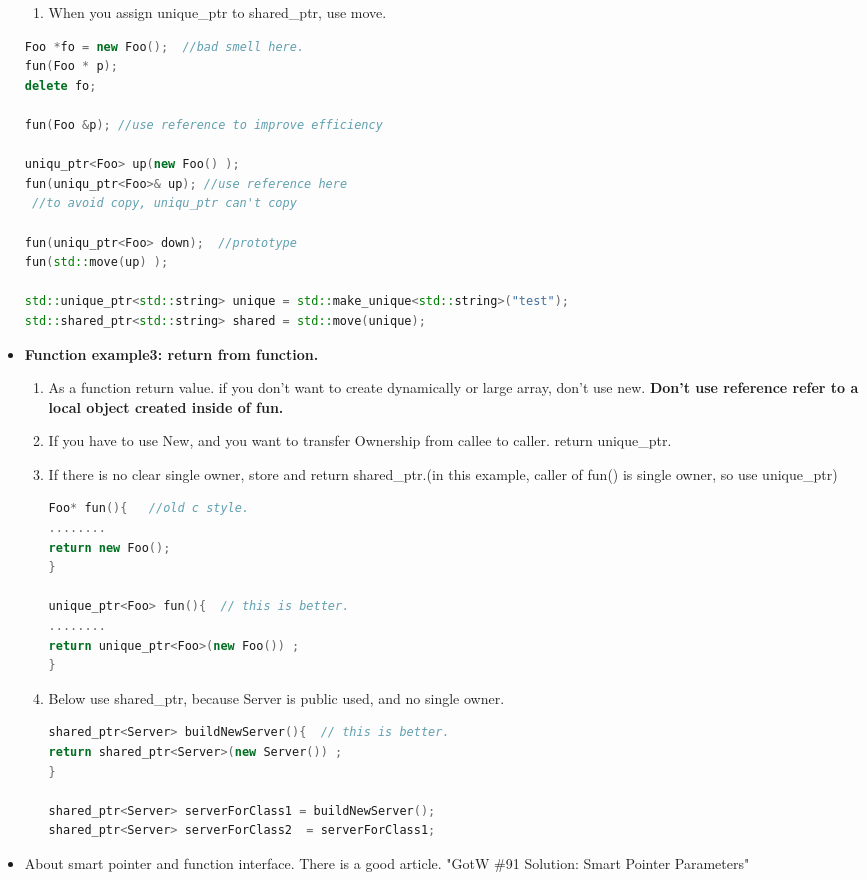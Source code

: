 \documentclass[a4paper,12pt,twoside]{book}
\begin{document}
\begin{itemize}
\begin{enumerate}
\item When you assign unique\_ptr to shared\_ptr, use move.
\end{enumerate}

\begin{lstlisting}[frame=single, language=c++]
Foo *fo = new Foo();  //bad smell here.
fun(Foo * p);
delete fo;

fun(Foo &p); //use reference to improve efficiency

uniqu_ptr<Foo> up(new Foo() );
fun(uniqu_ptr<Foo>& up); //use reference here
 //to avoid copy, uniqu_ptr can't copy

fun(uniqu_ptr<Foo> down);  //prototype
fun(std::move(up) );

std::unique_ptr<std::string> unique = std::make_unique<std::string>("test");
std::shared_ptr<std::string> shared = std::move(unique);
\end{lstlisting}

\item \textbf{Function example3: return from function.}
\begin{enumerate}
\item As a function return value. if you don't want to create dynamically or large array, don't use new. \textbf{Don't  use reference refer to a local object created inside of fun.}

\item If you have to use New, and you want to transfer Ownership from callee to caller. return unique\_ptr.

\item If there is no clear single owner, store and return shared\_ptr.(in this example, caller of fun() is single owner, so use unique\_ptr)

\begin{lstlisting}[frame=single, language=c++]
Foo* fun(){   //old c style.
........
return new Foo();
}

unique_ptr<Foo> fun(){  // this is better.
........
return unique_ptr<Foo>(new Foo()) ;
}
\end{lstlisting}

\item Below use shared\_ptr, because Server is public used, and no single owner.
\begin{lstlisting}[frame=single, language=c++]
shared_ptr<Server> buildNewServer(){  // this is better.
return shared_ptr<Server>(new Server()) ;
}

shared_ptr<Server> serverForClass1 = buildNewServer();
shared_ptr<Server> serverForClass2  = serverForClass1;
\end{lstlisting}

\end{enumerate}

\item About smart pointer and function interface. There is a good article. "GotW \#91 Solution: Smart Pointer Parameters"
\end{itemize}
\end{document}
